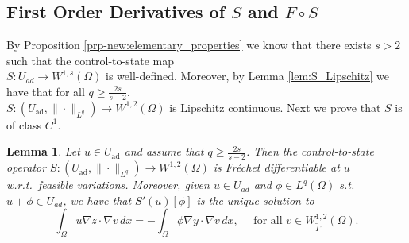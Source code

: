 \documentclass[11pt]{article}
\newcommand{\feas}{U_{\textrm{ad}}}
\newtheorem{lemma}[theorem]{Lemma}
\theoremstyle{definition}
\theoremstyle{remark}
\begin{document}
\subsection{First Order Derivatives of \texorpdfstring{$S$}{S} and \texorpdfstring{$F \circ S$}{F o S}}
%
By Proposition \ref{prp-new:elementary_properties} we know that there exists $s> 2$ such that the control-to-state map \\ $S: U_{ad} \to W^{1,s}(\Omega)$ is well-defined. Moreover, by Lemma \ref{lem:S_Lipschitz} we have that for all $q \ge \frac{2s}{s-2}$, \\
$
S : (\feas,\|\cdot\|_{L^{q}}) \to W^{1,2}(\Omega) $
is Lipschitz continuous. Next we prove that $S$ is of class $C^1$. \\



\begin{lemma}\label{lem:S_derivative}
Let $u \in \feas$ and assume that $q \geq \frac{2s}{s-2}$.
Then the control-to-state operator
$
S : (\feas, \|\cdot\|_{L^q}) \to W^{1,2}(\Omega)
$
 is Fr\'echet differentiable at $u$
w.r.t.\ feasible variations. Moreover, given $u \in U_{ad}$ and $\phi \in L^q(\Omega)$ s.t. $u+\phi \in U_{ad}$, we have that $S'(u)[\phi]$ is the unique solution to
\begin{equation}\label{eq:def_z_u_phi}
\int_\Omega u \nabla z \cdot \nabla v \, dx
=
-\int_\Omega \phi \nabla y \cdot \nabla v \, dx, \quad\text{ for all }v \in W^{1,2}_{\tilde\Gamma}(\Omega).
\end{equation}
\end{lemma}
\end{document}
